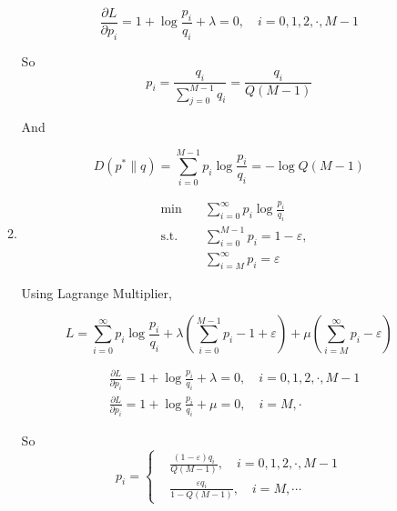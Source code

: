 \documentclass[a4paper]{article}
\begin{document}
\begin{enumerate}
\begin{enumerate}
  \begin{equation}
    \frac{\partial L}{\partial p_i} = 1 + \log \frac{p_i}{q_i}+  \lambda = 0,\quad  i = 0,1,2,\cdot,M-1
  \end{equation}

  So 
  \begin{equation}
    p_i = \frac{q_i}{\sum_{j=0}^{M-1} q_i} = \frac{q_i}{ Q(M-1)}
  \end{equation}

  And

  \begin{equation}
    D(p^*\| q) = \sum_{i=0}^{M-1} p_i\log \frac{p_i}{q_i} = - \log Q(M-1)
  \end{equation}

  \item \begin{equation}
    \begin{aligned}
      &\min \quad & \sum_{i=0}^{\infty} p_i\log \frac{p_i}{q_i} \\
      &\text{s.t.} \quad & \sum_{i=0}^{M-1} p_i= 1-\varepsilon, \\
      &  & \sum_{i=M}^{\infty} p_i= \varepsilon
    \end{aligned}
  \end{equation}

  Using Lagrange Multiplier,

  \begin{equation}
    L = \sum_{i=0}^{\infty} p_i\log \frac{p_i}{q_i}  + \lambda (\sum_{i=0}^{M-1} p_i -1+\varepsilon) + \mu(\sum_{i=M}^{\infty} p_i -\varepsilon)
  \end{equation}

  \begin{equation}
    \begin{aligned}
      &\frac{\partial L}{\partial p_i} = 1 + \log \frac{p_i}{q_i}+  \lambda = 0,\quad  i = 0,1,2,\cdot,M-1 \\
      & \frac{\partial L}{\partial p_i} = 1 + \log \frac{p_i}{q_i}+  \mu = 0,\quad  i = M,\cdot
    \end{aligned}
  \end{equation}

  So \begin{equation}
    p_i = \left\{\begin{aligned}
      &\frac{(1-\varepsilon)q_i}{ Q(M-1)},\quad i = 0,1,2,\cdot,M-1\\
      &\frac{\varepsilon q_i}{ 1-Q(M-1)},\quad i = M,\cdots
    \end{aligned}\right.
  \end{equation}


\end{enumerate}
\end{enumerate}
\end{document}
